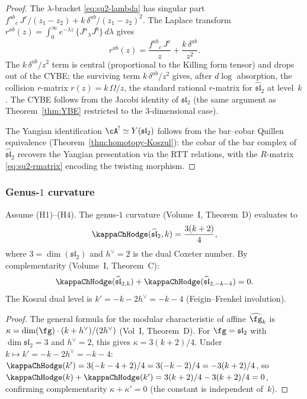 \begin{proof}
The $\lambda$-bracket \eqref{eq:su2-lambda} has singular part
$f^{ab}{}_c\, J^c / (z_1 - z_2) + k\, \delta^{ab} / (z_1 - z_2)^2$.
The Laplace transform
$r^{ab}(z) = \int_0^\infty e^{-\lambda z}\, \{J^a{}_\lambda J^b\}\, d\lambda$
gives
\[
r^{ab}(z) = \frac{f^{ab}{}_c\, J^c}{z} + \frac{k\, \delta^{ab}}{z^2}.
\]
The $k\,\delta^{ab}/z^2$ term is central (proportional to the Killing
form tensor) and drops out of the CYBE\@; the surviving term
$k\,\delta^{ab}/z^2$ gives, after $d\log$ absorption, the collision $r$-matrix $r(z) = k\,\Omega/z$, the standard rational
$r$-matrix for $\widehat{\mathfrak{sl}}_2$ at level~$k$. The CYBE follows from the
Jacobi identity of $\mathfrak{sl}_2$ (the same argument as
Theorem~\ref{thm:YBE} restricted to the $3$-dimensional case).

The Yangian identification
$\cA^! \simeq Y(\mathfrak{sl}_2)$ follows from the
bar--cobar Quillen equivalence
(Theorem~\ref{thm:homotopy-Koszul}): the cobar of the bar
complex of $\widehat{\mathfrak{sl}}_2$ recovers the Yangian
presentation via the RTT relations, with the $R$-matrix
\eqref{eq:su2-rmatrix} encoding the twisting morphism.
\end{proof}

\subsubsection{Genus-$1$ curvature}

\begin{proposition}
Assume \textrm{(H1)--(H4)}. The genus-$1$ curvature
(Volume~I, Theorem~D) evaluates to
\begin{equation}%
\kappaChHodge(\widehat{\mathfrak{sl}}_2, k) = \frac{3(k + 2)}{4},
\end{equation}
where $3 = \dim(\mathfrak{sl}_2)$ and $h^\vee = 2$ is the
dual Coxeter number. By complementarity (Volume~I, Theorem~C):
\begin{equation}
\kappaChHodge(\widehat{\mathfrak{sl}}_{2,k})
+ \kappaChHodge(\widehat{\mathfrak{sl}}_{2,-k-4}) = 0.
\end{equation}
The Koszul dual level is $k' = -k - 2h^\vee = -k - 4$
(Feigin--Frenkel involution).
\end{proposition}

\begin{proof}
The general formula for the modular characteristic of affine
$\widehat{\fg}_k$ is $\kappa = \dim(\fg)\cdot(k+h^\vee)/(2h^\vee)$
(Vol~I, Theorem~D). For $\fg = \mathfrak{sl}_2$
with $\dim\mathfrak{sl}_2 = 3$ and $h^\vee = 2$, this gives
$\kappa = 3(k+2)/4$.
Under $k \mapsto k' = -k - 2h^\vee = -k - 4$:
$\kappaChHodge(k') = 3(-k-4+2)/4 = 3(-k-2)/4 = -3(k+2)/4$,
so $\kappaChHodge(k) + \kappaChHodge(k') = 3(k+2)/4 - 3(k+2)/4 = 0$,
confirming complementarity $\kappa + \kappa' = 0$
(the constant is independent of~$k$).
\end{proof}


